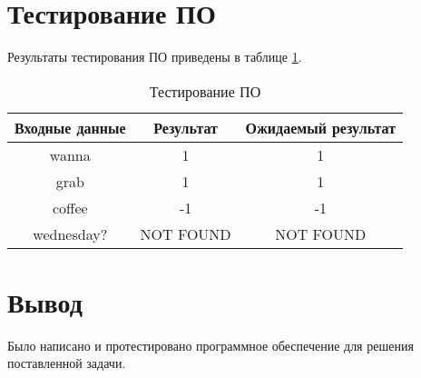 \section{Тестирование ПО}

Результаты тестирования ПО приведены в таблице \ref{table:testing}. 
\begin{table}[H]
	\captionsetup{singlelinecheck = false, justification=raggedleft}
	\caption{Тестирование ПО}
	\renewcommand{\arraystretch}{2}
	\begin{center}
		\begin{tabular}{||c|c|c||}
			\hline
			Входные данные & Результат  & Ожидаемый результат \\ \hline\hline
			wanna          & 1          & 1                   \\ \hline
			grab           & 1          & 1                   \\ \hline
			coffee         & -1          & -1                   \\ \hline
			wednesday?    & NOT FOUND & NOT FOUND          \\ \hline
		\end{tabular}
	\end{center}
	\label{table:testing}
\end{table}

\section{Вывод}
Было написано и протестировано программное обеспечение для решения поставленной задачи.